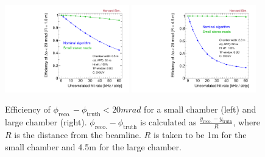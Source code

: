 \begin{figure}[!htpb]
  \begin{center}
    \includegraphics[width=0.48\textwidth]{figures/eff_phi_small_vs_rate.pdf}
    \includegraphics[width=0.48\textwidth]{figures/eff_phi_large_vs_rate.pdf}
  \end{center}
  \vspace{-10pt}
  \caption{Efficiency of $\phi_\text{reco.} - \phi_\text{truth} < 20 mrad$ for a small chamber (left) and large chamber (right). $\phi_\text{reco.}-\phi_\text{truth}$ is calculated as $\frac{y_\text{reco.} - y_\text{truth}}{R}$, where $R$ is the distance from the beamline. $R$ is taken to be 1m for the small chamber and 4.5m for the large chamber.}
  \label{fig:eff_vs_rate}
\end{figure}

